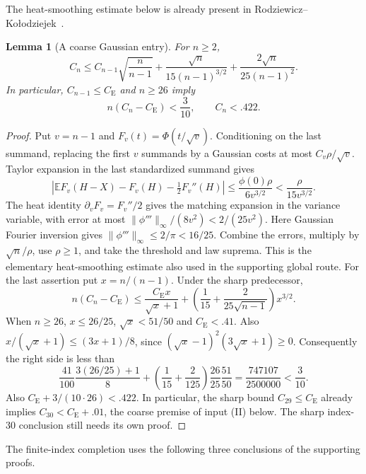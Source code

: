 \documentclass[aop,preprint]{imsart}
\newtheorem{lemma}[theorem]{Lemma}
\theoremstyle{definition}
\newcommand{\CE}{C_{\mathrm E}}
\newcommand{\E}{\mathbb E}
\numberwithin{equation}{section}
\begin{document}
The heat-smoothing estimate below is already present in
Rodziewicz--Ko\l{}odziejek~\cite[Section~15]{RK2026}.
\begin{lemma}[A coarse Gaussian entry]\label{gi:gaussian-entry}
For $n\ge2$,
\[
 C_n\le C_{n-1}\sqrt{\frac n{n-1}}
       +\frac{\sqrt n}{15(n-1)^{3/2}}
       +\frac{2\sqrt n}{25(n-1)^2}.
\]
In particular, $C_{n-1}\le\CE$ and $n\ge26$ imply
\begin{equation}\label{gi:small-excess}
 n(C_n-\CE)<\frac3{10},\qquad C_n<.422.
\end{equation}
\end{lemma}
\begin{proof}
Put $v=n-1$ and $F_v(t)=\Phi(t/\sqrt v)$. Conditioning on the last
summand, replacing the first $v$ summands by a Gaussian costs at most
$C_v\rho/\sqrt v$. Taylor expansion in the last standardized summand gives
\[
 \left|\E F_v(H-X)-F_v(H)-\tfrac12F_v''(H)\right|
 \le\frac{\phi(0)\rho}{6v^{3/2}}<\frac{\rho}{15v^{3/2}}.
\]
The heat identity $\partial_vF_v=F_v''/2$ gives the matching expansion
in the variance variable, with error at most
$\|\phi'''\|_\infty/(8v^2)<2/(25v^2)$. Here Gaussian Fourier
inversion gives $\|\phi'''\|_\infty\le2/\pi<16/25$.
Combine the errors, multiply by $\sqrt n/\rho$, use $\rho\ge1$,
and take the threshold and law suprema. This is the elementary
heat-smoothing estimate also used in the supporting global route.
For the last assertion put $x=n/(n-1)$. Under the sharp predecessor,
\[
 n(C_n-\CE)\le\frac{\CE x}{\sqrt x+1}
       +\left(\frac1{15}+\frac2{25\sqrt{n-1}}\right)x^{3/2}.
\]
When $n\ge26$, $x\le26/25$, $\sqrt x<51/50$ and $\CE<.41$.
Also $x/(\sqrt x+1)\le(3x+1)/8$, since
$(\sqrt x-1)^2(3\sqrt x+1)\ge0$. Consequently the right side is less than
\[
 \frac{41}{100}\frac{3(26/25)+1}{8}
 +\left(\frac1{15}+\frac2{125}\right)\frac{26}{25}\frac{51}{50}
 =\frac{747107}{2500000}<\frac3{10}.
\]
Also $\CE+3/(10\cdot26)<.422$.
In particular, the sharp bound $C_{29}\le\CE$ already implies
$C_{30}<\CE+.01$, the coarse premise of input (II)
below. The sharp index-$30$ conclusion still needs its own proof.
\end{proof}

The finite-index completion uses the following three conclusions of the
supporting proofs.
\end{document}
